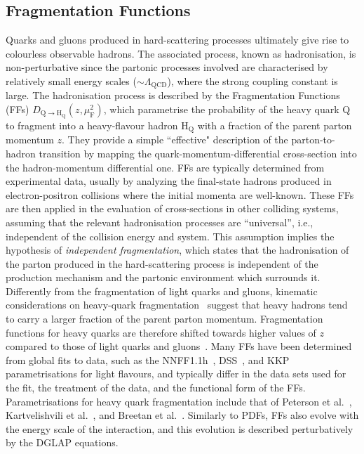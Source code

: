 \subsection{Fragmentation Functions}
\begin{sloppypar}
Quarks and gluons produced in hard-scattering processes ultimately give rise to colourless observable hadrons. The associated process, known as hadronisation, is non-perturbative since the partonic processes involved are characterised by relatively small energy scales ($\sim\Lambda_\mathrm{QCD}$), where the strong coupling constant is large. The hadronisation process is described by the Fragmentation Functions (FFs) $D_\mathrm{Q\rightarrow H_Q}(z,\mu_\mathrm{F}^2)$, which parametrise the probability of the heavy quark Q to fragment into a heavy-flavour hadron $\mathrm{H_Q}$ with a fraction of the parent parton momentum $z$. They provide a simple ``effective" description of the parton-to-hadron transition by mapping the quark-momentum-differential cross-section into the hadron-momentum differential one. FFs are typically determined from experimental data, usually by analyzing the final-state hadrons produced in electron-positron collisions where the initial momenta are well-known. These FFs are then applied in the evaluation of cross-sections in other colliding systems, assuming that the relevant hadronisation processes are “universal”, i.e., independent of the collision energy and system. This assumption implies the hypothesis of \emph{independent fragmentation}, which states that the hadronisation of the parton produced in the hard-scattering process is independent of the production mechanism and the partonic environment which surrounds it. Differently from the fragmentation of light quarks and gluons, kinematic considerations on heavy-quark fragmentation~\cite{Bjorken:1977md,Suzuki:1977km} suggest that heavy hadrons tend to carry a larger fraction of the parent parton momentum. Fragmentation functions for heavy quarks are therefore shifted towards higher values of $z$ compared to those of light quarks and gluons~\cite{Peterson:1982ak}. Many FFs have been determined from global fits to data, such as the NNFF1.1h~\cite{Bertone:2018ecm}, DSS~\cite{deFlorian:2007aj}, and KKP~\cite{Kniehl:2000fe} parametrisations for light flavours, and typically differ in the data sets used for the fit, the treatment of the data, and the functional form of the FFs. Parametrisations for heavy quark fragmentation include that of Peterson et al.~\cite{Peterson:1982ak}, Kartvelishvili et al.~\cite{Kartvelishvili:1977pi}, and Breetan et al.~\cite{Braaten:1994bz}. Similarly to PDFs, FFs also evolve with the energy scale of the interaction, and this evolution is described perturbatively by the DGLAP equations. 
\end{sloppypar}

